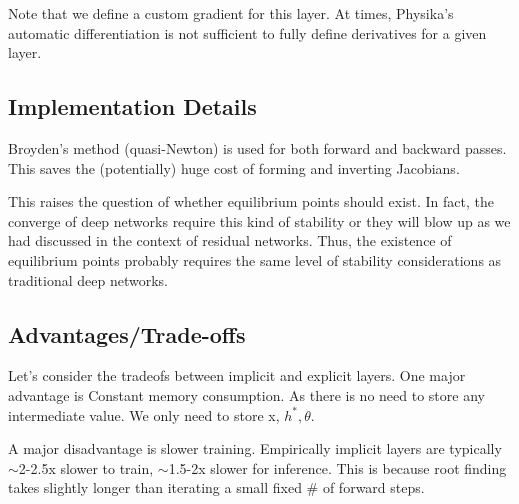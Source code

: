 \documentclass[book.tex]{subfiles}
\begin{document}
Note that we define a custom gradient for this layer. At times, Physika's automatic differentiation is not sufficient to fully define derivatives for a given layer.


\subsection{Implementation Details} 

Broyden’s method (quasi-Newton) is used for both forward and backward passes. This saves the (potentially) huge cost of forming and inverting Jacobians.

This raises the question of whether equilibrium points should exist.  In fact, the converge of deep networks require this kind of stability or they will blow up as we had discussed in the context of residual networks.  Thus, the existence of equilibrium points probably requires the same level of stability considerations as traditional deep networks.

\subsection{Advantages/Trade-offs}

Let's consider the tradeofs between implicit and explicit layers. One major advantage is Constant memory consumption. As there is no need to store any intermediate value. We only need to store x, $h^*, \theta$.


A major disadvantage is slower training. Empirically implicit layers are typically $\sim$2-2.5x slower to train, $\sim$1.5-2x slower for inference.  This is because root finding takes slightly longer than iterating a small fixed \# of forward steps.


\end{document}
